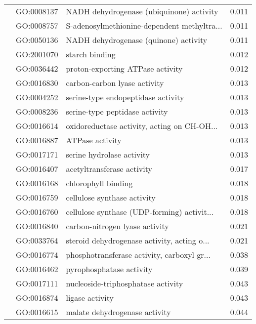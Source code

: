 \begin{longtable}{lllr}
   & GO:0008137 &     NADH dehydrogenase (ubiquinone) activity &         0.011 \\
   & GO:0008757 &  S-adenosylmethionine-dependent methyltra... &         0.011 \\
   & GO:0050136 &        NADH dehydrogenase (quinone) activity &         0.011 \\
   & GO:2001070 &                               starch binding &         0.012 \\
   & GO:0036442 &             proton-exporting ATPase activity &         0.012 \\
   & GO:0016830 &                 carbon-carbon lyase activity &         0.013 \\
   & GO:0004252 &           serine-type endopeptidase activity &         0.013 \\
   & GO:0008236 &               serine-type peptidase activity &         0.013 \\
   & GO:0016614 &  oxidoreductase activity, acting on CH-OH... &         0.013 \\
   & GO:0016887 &                              ATPase activity &         0.013 \\
   & GO:0017171 &                    serine hydrolase activity &         0.013 \\
   & GO:0016407 &                   acetyltransferase activity &         0.017 \\
   & GO:0016168 &                          chlorophyll binding &         0.018 \\
   & GO:0016759 &                  cellulose synthase activity &         0.018 \\
   & GO:0016760 &  cellulose synthase (UDP-forming) activit... &         0.018 \\
   & GO:0016840 &               carbon-nitrogen lyase activity &         0.021 \\
   & GO:0033764 &  steroid dehydrogenase activity, acting o... &         0.021 \\
   & GO:0016774 &  phosphotransferase activity, carboxyl gr... &         0.038 \\
   & GO:0016462 &                     pyrophosphatase activity &         0.039 \\
   & GO:0017111 &           nucleoside-triphosphatase activity &         0.043 \\
   & GO:0016874 &                              ligase activity &         0.043 \\
   & GO:0016615 &                malate dehydrogenase activity &         0.044 \\

\end{longtable}
